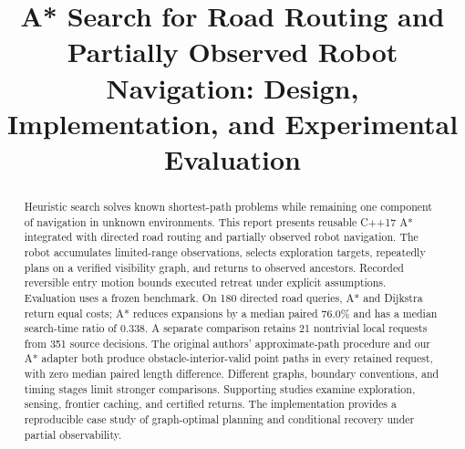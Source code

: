 \documentclass[runningheads]{llncs}
\begin{document}
\raggedbottom
\title{A* Search for Road Routing and Partially Observed Robot Navigation: Design, Implementation, and Experimental Evaluation}
\author{\ReportAuthor}
\authorrunning{\ReportRunningAuthor}
\institute{\ReportAffiliation}
\maketitle
\begin{abstract}
Heuristic search solves known shortest-path problems while remaining one component of navigation in unknown environments. This report presents reusable C++17 A* integrated with directed road routing and partially observed robot navigation. The robot accumulates limited-range observations, selects exploration targets, repeatedly plans on a verified visibility graph, and returns to observed ancestors. Recorded reversible entry motion bounds executed retreat under explicit assumptions. Evaluation uses a frozen benchmark. On 180 directed road queries, A* and Dijkstra return equal costs; A* reduces expansions by a median paired 76.0\% and has a median search-time ratio of 0.338. A separate comparison retains 21 nontrivial local requests from 351 source decisions. The original authors' approximate-path procedure and our A* adapter both produce obstacle-interior-valid point paths in every retained request, with zero median paired length difference. Different graphs, boundary conventions, and timing stages limit stronger comparisons. Supporting studies examine exploration, sensing, frontier caching, and certified returns. The implementation provides a reproducible case study of graph-optimal planning and conditional recovery under partial observability.
\end{abstract}











\end{document}
